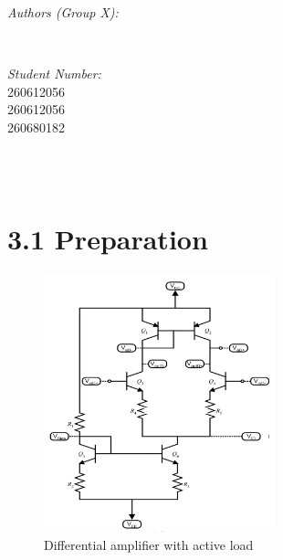 \documentclass[12pt]{article}
\makeatletter
\let\theauthor\@author
\let\thedate\@date
\makeatother
\begin{document}
\begin{titlepage}
\begin{minipage}{0.4\textwidth}
\begin{flushleft}
            \emph{Authors (Group X):}\\
            \theauthor
            \end{flushleft}
            \end{minipage}~
            \begin{minipage}{0.4\textwidth}
            \begin{flushright} \large
            \emph{Student Number:} \\
            260612056 \\ 260612056 \\ 260680182                                  %
        \end{flushright}
    \end{minipage}\\[2 cm]
 
    {\large \thedate}\\[2 cm]
 
    \vfill
    
\end{titlepage}


\section*{3.1 Preparation}

\begin{figure}[H]
\centering
\includegraphics[width=0.6\textwidth]{op_amp.PNG}
\caption{\label{fig:op-amp} Differential amplifier with active load}
\end{figure}
\end{document}
